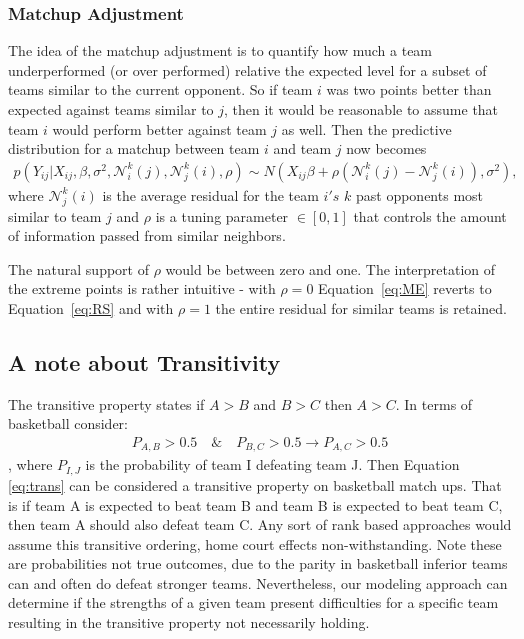\subsubsection{Matchup Adjustment}
The idea of the matchup adjustment is to quantify how much a team underperformed (or over performed) relative the expected level for a subset of teams similar to the current opponent.  So if team $i$ was two points better than expected against teams similar to $j$, then it would be reasonable to assume that team $i$ would perform better against team $j$ as well.  Then the predictive distribution for a matchup between team $i$ and team $j$ now becomes 
\begin{eqnarray}
p(Y_{ij}|X_{ij}, \beta,\sigma^2,\mathcal{N}_i^k(j),\mathcal{N}_j^k(i), \rho) \sim N(X_{ij} \beta + \rho(\mathcal{N}_i^k(j) -\mathcal{N}_j^k(i)), \sigma^2),
\label{eq:ME}
\end{eqnarray}
where $\mathcal{N}_j^k(i)$ is the average residual for the team $i's$ $k$ past opponents most similar to team $j$ and $\rho$ is a tuning parameter $\in [0,1]$ that controls the amount of information passed from similar neighbors. 

The natural support of $\rho$ would be between zero and one.  The interpretation of the extreme points is rather intuitive - with $\rho = 0$ Equation~\ref{eq:ME} reverts to Equation~\ref{eq:RS} and with $\rho = 1$ the entire residual for similar teams is retained. 
\subsection{A note about Transitivity}
The transitive property states if $A>B$ and $B>C$ then $A>C$.   In terms of basketball consider:
\begin{eqnarray}
P_{A,B} > 0.5 \quad \& \quad P_{B,C} > 0.5 \rightarrow P_{A,C} > 0.5
\label{eq:trans}
\end{eqnarray}
, where $P_{I,J}$ is the probability of team I defeating team J.  Then Equation \ref{eq:trans} can be considered a transitive property on basketball match ups.  That is if team A is expected to beat team B and team B is expected to beat team C, then team A should also defeat team C.  Any sort of rank based approaches would assume this transitive ordering, home court effects non-withstanding.  Note these are probabilities not true outcomes, due to the parity in basketball inferior teams can and often do defeat stronger teams.  Nevertheless, our modeling approach can determine if the strengths of a given team present difficulties for a specific team resulting in the transitive property not necessarily holding.
